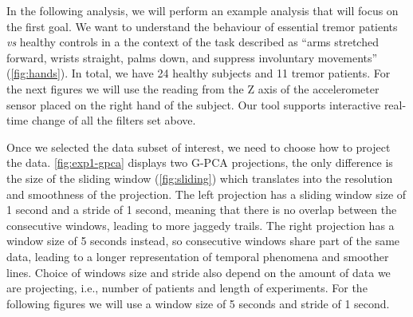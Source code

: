 In the following analysis, we will perform an example analysis that will focus on the first goal. We want to understand the behaviour of essential tremor patients \textit{vs} healthy controls in a the context of the task described as ``arms stretched forward, wrists straight, palms down, and suppress involuntary movements'' (\cref{fig:hands}). In total, we have 24 healthy subjects and 11 tremor patients.
For the next figures we will use the reading from the Z axis of the accelerometer sensor placed on the right hand of the subject. Our tool supports interactive real-time change of all the filters set above.

Once we selected the data subset of interest, we need to choose how to project the data. \cref{fig:exp1-gpca} displays two G-PCA projections, the only difference is the size of the sliding window (\cref{fig:sliding}) which translates into the resolution and smoothness of the projection. The left projection has a sliding window size of 1 second and a stride of 1 second, meaning that there is no overlap between the consecutive windows, leading to more jaggedy trails. The right projection has a window size of 5 seconds instead, so consecutive windows share part of the same data, leading to a longer representation of temporal phenomena and smoother lines. Choice of windows size and stride also depend on the amount of data we are projecting, i.e., number of patients and length of experiments. For the following figures we will use a window size of 5 seconds and stride of 1 second. 

